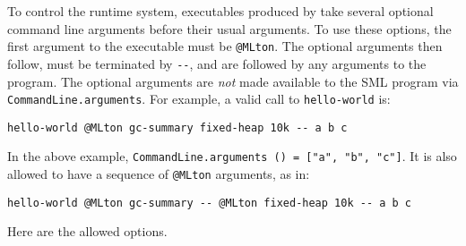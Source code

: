 To control the runtime system, executables produced by {\mlton} take
several optional command line arguments before their usual arguments.
To use these options, the first argument to the executable must be
\verb+@MLton+.  The optional arguments then follow, must be
terminated by \verb+--+, and are followed by any arguments to the
program.  The optional arguments are {\em not} made available to the
SML program via {\tt CommandLine.arguments}.  For example, a valid
call to {\tt hello-world} is:
\begin{verbatim}
hello-world @MLton gc-summary fixed-heap 10k -- a b c
\end{verbatim}
In the above example, {\tt CommandLine.arguments () = ["a", "b",
"c"]}.  It is also allowed to have a sequence of \verb+@MLton+
arguments, as in:
\begin{verbatim}
hello-world @MLton gc-summary -- @MLton fixed-heap 10k -- a b c
\end{verbatim}

Here are the allowed options.

